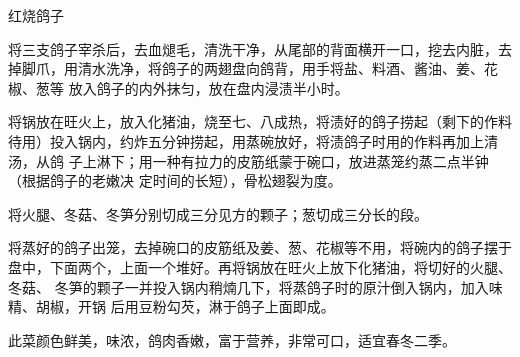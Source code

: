\begin{recipe}{红烧鸽子}

\ingredients


\preparation

\step 将三支鸽子宰杀后，去血煺毛，清洗干净，从尾部的背面横开一口，挖去内脏，去
掉脚爪，用清水洗净，将鸽子的两翅盘向鸽背，用手将盐、料酒、酱油、姜、花椒、葱等
放入鸽子的内外抹匀，放在盘内浸渍半小时。

\step 将锅放在旺火上，放入化猪油，烧至七、八成热，将渍好的鸽子捞起（剩下的作料
待用）投入锅内，约炸五分钟捞起，用蒸碗放好，将渍鸽子时用的作料再加上清汤，从鸽
子上淋下；用一种有拉力的皮筋纸蒙于碗口，放进蒸笼约蒸二点半钟（根据鸽子的老嫩决
定时间的长短），骨松翅裂为度。

\step 将火腿、冬菇、冬笋分别切成三分见方的颗子；葱切成三分长的段。

\step 将蒸好的鸽子出笼，去掉碗口的皮筋纸及姜、葱、花椒等不用，将碗内的鸽子摆于
盘中，下面两个，上面一个堆好。再将锅放在旺火上放下化猪油，将切好的火腿、冬菇、
冬笋的颗子一并投入锅内稍煵几下，将蒸鸽子时的原汁倒入锅内，加入味精、胡椒，开锅
后用豆粉勾芡，淋于鸽子上面即成。

\features

此菜颜色鲜美，味浓，鸽肉香嫩，富于营养，非常可口，适宜春冬二季。

\end{recipe}

